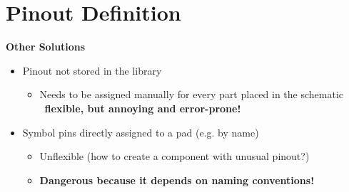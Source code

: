 \section{Pinout Definition}

\begin{frame}{\secname}
  \textbf{Other Solutions}
  \begin{itemize}
    \item Pinout not stored in the library
      \begin{itemize}
        \item Needs to be assigned manually for every part placed in the schematic
              \faArrowRight\ \textbf{flexible, but annoying and error-prone!}
      \end{itemize}
    \pause
    \item Symbol pins directly assigned to a pad (e.g. by name)
      \begin{itemize}
        \item Unflexible (how to create a component with unusual pinout?)
        \item \textbf{Dangerous because it depends on naming conventions!}
      \end{itemize}
  \end{itemize}
\end{frame}